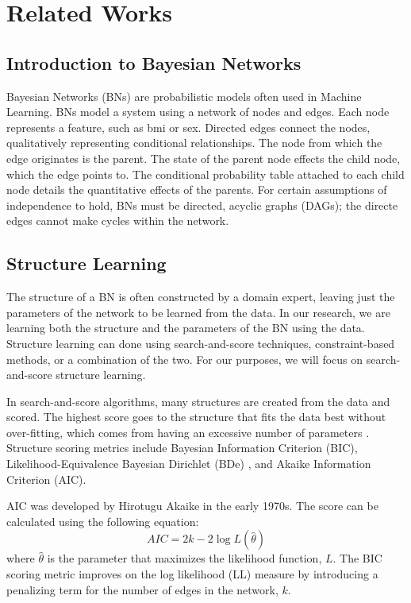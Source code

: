 \section{Related Works}

\subsection{Introduction to Bayesian Networks}

Bayesian Networks (BNs) are probabilistic models often used in Machine Learning. BNs model a system using a network of nodes and edges. Each node represents a feature, such as bmi or sex. Directed edges connect the nodes, qualitatively representing conditional relationships. The node from which the edge originates is the parent. The state of the parent node effects the child node, which the edge points to. The conditional probability table attached to each child node details the quantitative effects of the parents. For certain assumptions of independence to hold, BNs must be directed, acyclic graphs (DAGs); the directe edges cannot make cycles within the network.\cite{Russell1995}

\subsection{Structure Learning}
The structure of a BN is often constructed by a domain expert, leaving just the parameters of the network to be learned from the data. In our research, we are learning both the structure and the parameters of the BN using the data. Structure learning can done using search-and-score techniques, constraint-based methods, or a combination of the two. For our purposes, we will focus on search-and-score structure learning. 

In search-and-score algorithms, many structures are created from the data and scored. The highest score goes to the structure that fits the data best without over-fitting, which comes from having an excessive number of parameters \cite{Vol2012}. Structure scoring metrics include Bayesian Information Criterion (BIC), Likelihood-Equivalence Bayesian Dirichlet (BDe) \cite{Heckerman1995}, and Akaike Information Criterion (AIC).

AIC was developed by Hirotugu Akaike \cite{Akaike1974} in the early 1970s. The score can be calculated using the following equation:
\begin{equation}
    AIC = 2k - 2\log L(\hat{\theta})
\end{equation}
where \begin{math} \hat{\theta} \end{math} is the parameter that maximizes the likelihood function, \begin{math} L \end{math}. The BIC scoring metric improves on the log likelihood (LL) measure by introducing a penalizing term for the number of edges in the network, \begin{math} k \end{math}.


